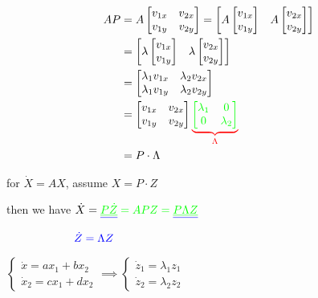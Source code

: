 \documentclass[
  letterpaper,
  DIV=11,
  numbers=noendperiod,
  oneside]{scrreprt}
\begin{document}
\begin{align*}
AP &= A \begin{bmatrix}v_{1x} & v_{2x} \\ v_{1y} & v_{2y}\end{bmatrix} = \begin{bmatrix}A \begin{bmatrix}v_{1x}\\v_{1y}\end{bmatrix} & A \begin{bmatrix}v_{2x}\\v_{2y}\end{bmatrix}\end{bmatrix} \\
&= \begin{bmatrix}\lambda \begin{bmatrix}v_{1x}\\v_{1y}\end{bmatrix} & \lambda \begin{bmatrix}v_{2x}\\v_{2y}\end{bmatrix}\end{bmatrix} \\
&= \begin{bmatrix}\lambda_1 v_{1x} & \lambda_2 v_{2x} \\ \lambda_1 v_{1y} & \lambda_2 v_{2y}\end{bmatrix} \\
&= \begin{bmatrix}v_{1x} & v_{2x} \\ v_{1y} & v_{2y}\end{bmatrix} \color{red}\underset{\Lambda}{\underbrace{\color{green}\begin{bmatrix}\lambda_1 & 0 \\ 0 & \lambda_2\end{bmatrix}}} \\
&= P \cdot \Lambda
\end{align*}

for \(\dot{X} = AX\), assume \(X = P \cdot Z\)

then we have
\(\dot{X} = \color{blue}\underline{\underline{\color{green}P \dot{Z}}} \color{green} = APZ = \color{blue}\underline{\underline{\color{green}P \Lambda Z}}\)

\(\qquad\qquad \color{blue}\qquad \dot{Z} = \Lambda Z\)

\(\begin{cases}\dot{x} = ax_1+bx_2 \\ \dot{x}_2 = cx_1 + dx_2\end{cases} \implies \begin{cases}\dot{z}_1 = \lambda_1 z_1 \\ \dot{z}_2 = \lambda_2 z_2\end{cases}\)
\end{document}
